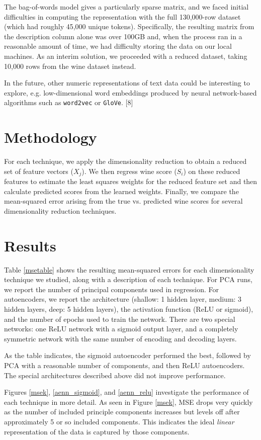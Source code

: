\documentclass{article}
\begin{document}
The bag-of-words model gives a particularly sparse matrix, and we faced initial difficulties in computing the representation with the full 130,000-row dataset (which had roughly 45,000 unique tokens). Specifically, the resulting matrix from the description column alone was over 100GB and, when the process ran in a reasonable amount of time, we had difficulty storing the data on our local machines. As an interim solution, we proceeded with a reduced dataset, taking 10,000 rows from the wine dataset instead. 

In the future, other numeric representations of text data could be interesting to explore, e.g. low-dimensional word embeddings produced by neural network-based algorithms such as \verb+word2vec+ or \verb+GloVe+. [8] 

\section{Methodology}
For each technique, we apply the dimensionality reduction to obtain a reduced set of feature vectors ($X_j$). We then regress wine score ($S_i$) on these reduced features to estimate the least squares weights for the reduced feature set and then calculate predicted scores from the learned weights. Finally, we compare the mean-squared error arising from the true vs. predicted wine scores for several dimensionality reduction techniques.

\section{Results}
Table \ref{msetable} shows the resulting mean-squared errors for each dimensionality technique we studied, along with a description of each technique. For PCA runs, we report the number of principal components used in regression. For autoencoders, we report the architecture (shallow: 1 hidden layer, medium: 3 hidden layers, deep: 5 hidden layers), the activation function (ReLU or sigmoid), and the number of epochs used to train the network. There are two special networks: one ReLU network with a sigmoid output layer, and a completely symmetric network with the same number of encoding and decoding layers. 

As the table indicates, the sigmoid autoencoder performed the best, followed by PCA with a reasonable number of components, and then ReLU autoencoders. The special architectures described above did not improve performance.

Figures \ref{msek}, \ref{aenn_sigmoid}, and \ref{aenn_relu} investigate the performance of each technique in more detail. As seen in Figure \ref{msek}, MSE drops very quickly as the number of included principle components increases but levels off after approximately 5 or so included components. This indicates the ideal \emph{linear} representation of the data is captured by those components.
\end{document}
